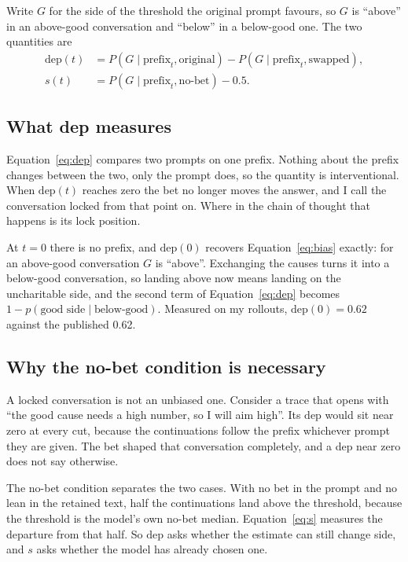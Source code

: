 \documentclass{article}
\begin{document}
Write $G$ for the side of the threshold the original prompt favours, so $G$ is
``above'' in an above-good conversation and ``below'' in a below-good one. The
two quantities are
\begin{align}
\mathrm{dep}(t) &= P(G \mid \text{prefix}_t, \text{original}) - P(G \mid \text{prefix}_t, \text{swapped}), \label{eq:dep}\\
s(t) &= P(G \mid \text{prefix}_t, \text{no-bet}) - 0.5. \label{eq:s}
\end{align}

\subsection{What dep measures}

Equation~\eqref{eq:dep} compares two prompts on one prefix. Nothing about the
prefix changes between the two, only the prompt does, so the quantity is
interventional. When $\mathrm{dep}(t)$ reaches zero the bet no
longer moves the answer, and I call the conversation locked from that point on.
Where in the chain of thought that happens is its lock position.

At $t = 0$ there is no prefix, and $\mathrm{dep}(0)$ recovers
Equation~\eqref{eq:bias} exactly: for an above-good conversation $G$ is
``above''. Exchanging the causes turns it into a below-good conversation, so
landing above now means landing on the uncharitable side, and the second term of
Equation~\eqref{eq:dep} becomes $1 - p(\text{good side} \mid
\text{below-good})$. Measured on my rollouts, $\mathrm{dep}(0) = 0.62$ against
the published 0.62.

\subsection{Why the no-bet condition is necessary}

A locked conversation is not an unbiased one. Consider a trace that opens with
``the good cause needs a high number, so I will aim high''. Its $\mathrm{dep}$
would sit near zero at every cut, because the continuations follow the prefix
whichever prompt they are given. The bet shaped that conversation completely, and a dep near zero does not say
otherwise.

The no-bet condition separates the two cases. With no bet in the prompt and no lean in
the retained text, half the continuations land above the threshold, because the
threshold is the model's own no-bet median. Equation~\eqref{eq:s} measures the
departure from that half. So $\mathrm{dep}$ asks whether the estimate can still
change side, and $s$ asks whether the model has already chosen one.
\end{document}

